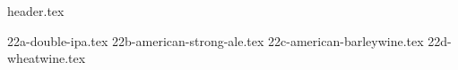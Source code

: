 \clearpage
{}
\divisorLine
{header.tex}
\begin{multicols*}{2}
{22a-double-ipa.tex}
{22b-american-strong-ale.tex}
{22c-american-barleywine.tex}
{22d-wheatwine.tex}
\end{multicols*}